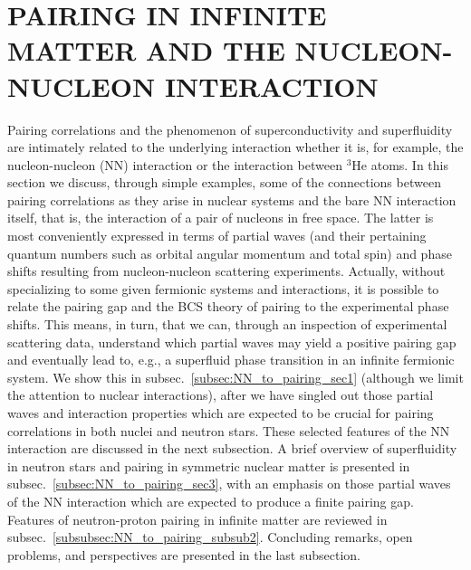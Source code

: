 \documentclass[rmp,aps,floatfix]{revtex4}
\begin{document}





%
\section{PAIRING IN INFINITE MATTER AND THE NUCLEON-NUCLEON INTERACTION}
\label{sec:NN_to_pairing}


Pairing correlations and the phenomenon of superconductivity and superfluidity
are intimately related to the underlying interaction whether it 
is, for example,
the nucleon-nucleon
(NN) interaction or the interaction between $^{3}$He atoms.  
In  this section we discuss, through simple examples,
some of the connections between pairing correlations as they arise 
in nuclear systems and the bare NN
interaction itself, that is, the interaction of  a pair of nucleons
in free space. The latter is most conveniently expressed in terms
of partial waves (and their pertaining quantum numbers such as orbital angular 
momentum and total spin) and phase shifts resulting from nucleon-nucleon
scattering experiments. 
Actually, without specializing to some given fermionic systems 
and interactions, it is possible
to relate the pairing gap and the BCS theory of pairing 
to the experimental phase shifts. This means, in turn, that we can,
through an inspection of experimental scattering data, understand
which partial waves may yield a 
positive pairing gap and eventually lead to, e.g., 
a superfluid phase transition 
in an infinite
fermionic system.
We show this in subsec.~\ref{subsec:NN_to_pairing_sec1} (although we 
limit the attention to nuclear interactions),
after we have singled out those partial waves and 
interaction properties which are expected to be crucial for pairing
correlations in both nuclei and neutron stars. These selected features
of the NN interaction are discussed in the next subsection. A
brief overview of superfluidity in neutron stars and pairing
in symmetric nuclear matter
is presented in subsec.~\ref{subsec:NN_to_pairing_sec3}, with an emphasis
on those partial waves of the NN interaction which are expected  
to produce a finite pairing gap. Features of neutron-proton pairing
in infinite matter are reviewed in 
subsec.~\ref{subsubsec:NN_to_pairing_subsub2}.
Concluding remarks, open problems,
and perspectives are presented in the last subsection.
\end{document}
